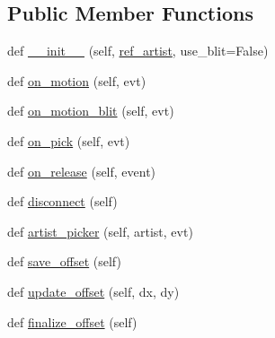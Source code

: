 \subsection*{Public Member Functions}
\begin{DoxyCompactItemize}
\item 
def \hyperlink{classmatplotlib_1_1offsetbox_1_1DraggableBase_a373543cce0b5927f9e7810537b27b65d}{\+\_\+\+\_\+init\+\_\+\+\_\+} (self, \hyperlink{classmatplotlib_1_1offsetbox_1_1DraggableBase_aee9675f921b3b97a1b75e20fc11bf8ba}{ref\+\_\+artist}, use\+\_\+blit=False)
\item 
def \hyperlink{classmatplotlib_1_1offsetbox_1_1DraggableBase_a78decd40119b3605a702514af83b1db0}{on\+\_\+motion} (self, evt)
\item 
def \hyperlink{classmatplotlib_1_1offsetbox_1_1DraggableBase_a11c685179256a9dae612149cca1518af}{on\+\_\+motion\+\_\+blit} (self, evt)
\item 
def \hyperlink{classmatplotlib_1_1offsetbox_1_1DraggableBase_a94cfbf699b8428c8c90fa9904df2e14a}{on\+\_\+pick} (self, evt)
\item 
def \hyperlink{classmatplotlib_1_1offsetbox_1_1DraggableBase_a798a3437dddb1727b94b6260ad45e1d4}{on\+\_\+release} (self, event)
\item 
def \hyperlink{classmatplotlib_1_1offsetbox_1_1DraggableBase_a1de5665472c34ce2ade4e64884c82277}{disconnect} (self)
\item 
def \hyperlink{classmatplotlib_1_1offsetbox_1_1DraggableBase_a4bf11104a5f337a8865c71e6178e5029}{artist\+\_\+picker} (self, artist, evt)
\item 
def \hyperlink{classmatplotlib_1_1offsetbox_1_1DraggableBase_a72b6cf37b188c6ca023c4096a88c1ea2}{save\+\_\+offset} (self)
\item 
def \hyperlink{classmatplotlib_1_1offsetbox_1_1DraggableBase_a0e56a48a0b39d0c10f0ef7ae72c795ef}{update\+\_\+offset} (self, dx, dy)
\item 
def \hyperlink{classmatplotlib_1_1offsetbox_1_1DraggableBase_a5807530f1063baf108e2f33b557675cd}{finalize\+\_\+offset} (self)
\end{DoxyCompactItemize}
